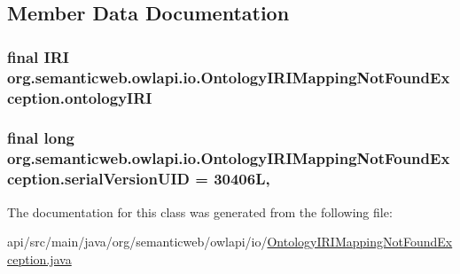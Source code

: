 \subsection{Member Data Documentation}
\hypertarget{classorg_1_1semanticweb_1_1owlapi_1_1io_1_1_ontology_i_r_i_mapping_not_found_exception_a92f0ecaca4878a3b3a4afc990f000dab}{
\subsubsection[{ontology\-I\-R\-I}]{\setlength{\rightskip}{0pt plus 5cm}final {\bf I\-R\-I} org.\-semanticweb.\-owlapi.\-io.\-Ontology\-I\-R\-I\-Mapping\-Not\-Found\-Exception.\-ontology\-I\-R\-I\hspace{0.3cm}{\ttfamily [private]}}}\label{classorg_1_1semanticweb_1_1owlapi_1_1io_1_1_ontology_i_r_i_mapping_not_found_exception_a92f0ecaca4878a3b3a4afc990f000dab}
\hypertarget{classorg_1_1semanticweb_1_1owlapi_1_1io_1_1_ontology_i_r_i_mapping_not_found_exception_abe3ab014827c1f54df52d8db8ee0b30b}{
\subsubsection[{serial\-Version\-U\-I\-D}]{\setlength{\rightskip}{0pt plus 5cm}final long org.\-semanticweb.\-owlapi.\-io.\-Ontology\-I\-R\-I\-Mapping\-Not\-Found\-Exception.\-serial\-Version\-U\-I\-D = 30406\-L\hspace{0.3cm}{\ttfamily [static]}, {\ttfamily [private]}}}\label{classorg_1_1semanticweb_1_1owlapi_1_1io_1_1_ontology_i_r_i_mapping_not_found_exception_abe3ab014827c1f54df52d8db8ee0b30b}


The documentation for this class was generated from the following file\-:\begin{DoxyCompactItemize}
\item 
api/src/main/java/org/semanticweb/owlapi/io/\hyperlink{_ontology_i_r_i_mapping_not_found_exception_8java}{Ontology\-I\-R\-I\-Mapping\-Not\-Found\-Exception.\-java}\end{DoxyCompactItemize}
